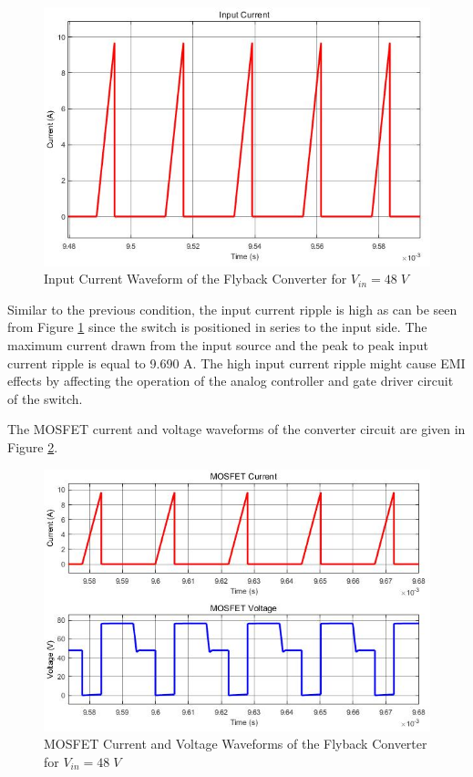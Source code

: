 \begin{figure}[H]
\begin{center}
\includegraphics[width=1\textwidth]{input_current_48.jpg}
\caption{Input Current Waveform of the Flyback Converter for $ V_{in} = 48\;V $}
\label{fig:incurr48}
\end{center}
\end{figure}

Similar to the previous condition, the input current ripple is high as can be seen from Figure \ref{fig:incurr48} since the switch is positioned in series to the input side. The maximum current drawn from the input source and the peak to peak input current ripple is equal to 9.690 A. The high input current ripple might cause EMI effects by affecting the operation of the analog controller and gate driver circuit of the switch.

The MOSFET current and voltage waveforms of the converter circuit are given in Figure \ref{fig:mos48}.

\begin{figure}[H]
\begin{center}
\includegraphics[width=1\textwidth]{MOSFET_curr_volt_48.jpg}
\caption{MOSFET Current and Voltage Waveforms of the Flyback Converter for $ V_{in} = 48\;V $}
\label{fig:mos48}
\end{center}
\end{figure}


